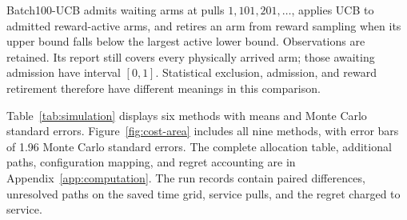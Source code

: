 \documentclass[11pt]{article}
\theoremstyle{remark}
\begin{document}
Batch100-UCB admits waiting arms at pulls $1,101,201,\ldots$, applies UCB
to admitted reward-active arms, and retires an arm from reward sampling
when its upper bound falls below the largest active lower bound.
Observations are retained. Its report still covers every physically
arrived arm; those awaiting admission have interval $[0,1]$. Statistical
exclusion, admission, and reward retirement therefore have different
meanings in this comparison.

Table~\ref{tab:simulation} displays six methods with means and Monte Carlo
standard errors. Figure~\ref{fig:cost-area} includes all nine methods, with
error bars of 1.96 Monte Carlo standard errors. The complete allocation
table, additional paths, configuration mapping, and regret accounting are
in Appendix~\ref{app:computation}. The run records contain paired
differences, unresolved paths on the saved time grid, service pulls, and
the regret charged to service.
\end{document}
